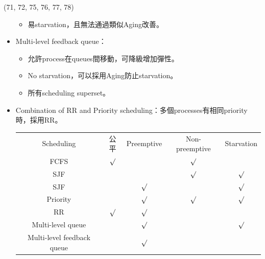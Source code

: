 \begin{theorem}{(71, 72, 75, 76, 77, 78)}
\begin{itemize}
\begin{itemize}
            \item 易starvation，且無法通過類似Aging改善。
        \end{itemize}
        \item Multi-level feedback queue：\begin{itemize}
            \item 允許process在queues間移動，可降級增加彈性。
            \item No starvation，可以採用Aging防止starvation。
            \item 所有scheduling superset。
        \end{itemize}
        \item Combination of RR and Priority scheduling：多個processes有相同priority時，採用RR。
        \begin{table}[H]
            \centering
            \begin{tabular}{|c|c|c|c|c|}
                \hline
                Scheduling & 公平 & Preemptive & Non-preemptive & Starvation \\
                \Xhline{2\arrayrulewidth}
                FCFS & $\surd$ & & $\surd$ & \\
                \hline
                SJF & & & $\surd$ & $\surd$ \\
                \hline
                SJF & & $\surd$ & & $\surd$ \\
                \hline
                Priority & & $\surd$ & $\surd$ & $\surd$\\
                \hline
                RR & $\surd$ & $\surd$ & & \\
                \hline
                Multi-level queue & & $\surd$ & & $\surd$ \\
                \hline
                Multi-level feedback queue & & $\surd$ & & \\
                \hline
            \end{tabular}
        \end{table}
    \end{itemize}
\end{theorem}

